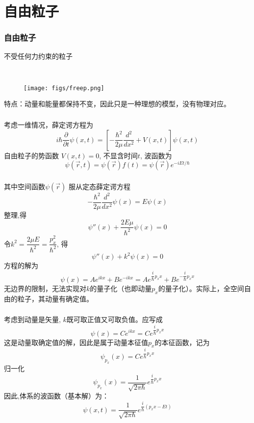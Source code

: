 \section{自由粒子}
\begin{frame} 
    \frametitle{自由粒子}
    \emf[自由粒子:] 不受任何力约束的粒子

    ~~\\ 
    \begin{figure}[htbp]
        \centering
        \texttt{[image: figs/freep.png]}
    \end{figure}
    特点：动量和能量都保持不变，因此只是一种理想的模型，没有物理对应。 
\end{frame}

\begin{frame}
	\frametitle{}
	\解 考虑一维情况，薛定谔方程为
	\begin{equation*}
	   i\hbar \frac{\partial }{\partial t} \psi(x,t) =\left [ -\frac{\hbar^2}{2\mu }\frac{d^2 }{d x^2 } + V(x,t) \right ]\psi(x,t) 
	\end{equation*}
	自由粒子的势函数 $ V(x,t) = 0 $, 不显含时间$t$, 波函数为$$ \psi(\vec{r},t)  =  \psi(\vec{r}) f(t) = \psi(\vec{r}) e^{-iEt/\hbar}  $$
 \end{frame}

\begin{frame}
	\frametitle{}
    其中空间函数$ \psi(\vec{r})$ 服从定态薛定谔方程
	$$
	-\dfrac{\hbar^2}{2\mu } \frac{d^2 }{d x^2}\psi(x) = E \psi(x)
	$$  
 整理,得
 $$
 \psi''(x) + \dfrac{2E\mu }{\hbar^2} \psi(x)=0
 $$ 
 令$ k ^2 = \dfrac{2 \mu E }{\hbar^2}=\dfrac{p^2_x }{\hbar^2} $, 得 
 $$
 \psi''(x) + k ^2 \psi(x)=0
 $$  
方程的解为
$$
\psi(x) = A e^{i k x}+Be^{-i k x} = A e^{\dfrac{i}{\hbar}p_x x}  + B e^{-\dfrac{i}{\hbar}p_x x}   
 $$
 无边界的限制，无法实现对$k$的量子化（也即动量$p_x$的量子化）。实际上，全空间自由的粒子，其动量有确定值。
\end{frame}

\begin{frame}
  \frametitle{}
  考虑到动量是矢量, $k$既可取正值又可取负值。应写成
 $$
 \psi(x)= C e^{i k x} = C e^{\dfrac{i}{\hbar}p_x x} 
 $$ 
  这是动量取确定值的解，因此是属于动量本征值$p_x$的本征函数，记为 $$\psi _{p_x} (x) = C e^{\dfrac{i}{\hbar}p_x x} $$
  归一化
  $$\psi _{p_x} (x) =  \frac{1}{\sqrt{2\pi \hbar}} e^{\dfrac{i}{\hbar}p_x x}  $$
  因此,体系的波函数（基本解）为：
  $$ \psi(x,t) = \frac{1}{\sqrt{2\pi \hbar }}e^{\dfrac{i}{\hbar}(p_x x  - E t)}  $$
\end{frame} 

